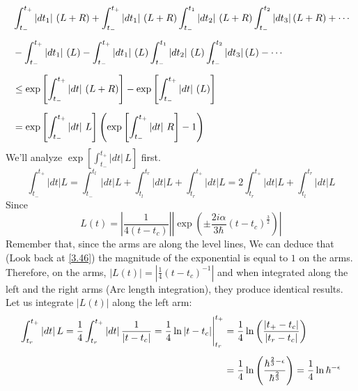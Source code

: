 \documentclass[12pt,a4paper]{article}
\begin{document}
	\begin{align}
		&\int_{t_{-}}^{t_{+}} \left| dt_{1} \right|\, \left( L + R \right) + \int_{t_{-}}^{t_{+}} \left| dt_{1} \right|\, \left( L + R \right) \int_{t_{-}}^{t_{1}} \left| dt_{2} \right|\, \left( L + R \right) \int_{t_{-}}^{t_{2}} \left| dt_{3} \right| \left( L + R \right) + \cdots \notag \\[5pt]
		&- \int_{t_{-}}^{t_{+}} \left| dt_{1} \right|\, \left( L \right) - \int_{t_{-}}^{t_{+}} \left| dt_{1} \right|\, \left( L \right) \int_{t_{-}}^{t_{1}} \left| dt_{2} \right|\, \left( L \right) \int_{t_{-}}^{t_{2}} \left| dt_{3} \right| \left( L \right) - \cdots \notag \\[5pt]
		&\leq \exp\left[ \int_{t_{-}}^{t_{+}} \left| dt \right|\, \left( L + R \right) \right] - \exp\left[ \int_{t_{-}}^{t_{+}} \left| dt \right|\, \left( L \right) \right] \notag \\[5pt]
		&= \exp\left[ \int_{t_{-}}^{t_{+}} \left| dt \right|\, L \right] \left( \exp\left[ \int_{t_{-}}^{t_{+}} \left| dt \right|\, R \right] - 1 \right) \label{4.64}
	\end{align}
	We'll analyze $\exp\left[ \int_{t_{-}}^{t_{+}} \left| dt \right|\, L \right]$ first. 
	\begin{equation}
		\int_{t_{-}}^{t_{+}} \left| dt \right| L = \int_{t_{-}}^{t_{l}} \left| dt \right| L + \int_{t_{l}}^{t_{r}} \left| dt \right| L + \int_{t_{r}}^{t_{+}} \left| dt \right| L = 2 \int_{t_{r}}^{t_{+}} \left| dt \right| L + \int_{t_{l}}^{t_{r}} \left| dt \right| L \label{4.65}
	\end{equation}
	Since
	\begin{equation}
		L(t) = \left| \dfrac{1}{4 \left( t - t_{c} \right)} \right| \left| \exp \left( \pm \dfrac{2i\alpha}{3\hbar} \left( t - t_{c} \right)^{\frac{3}{2}} \right) \right| \label{4.66}
	\end{equation}
	Remember that, since the arms are along the level lines, We can deduce that (Look back at \eqref{3.46}) the magnitude of the exponential is equal to $1$ on the arms. Therefore, on the arms, $\left| L(t) \right| = \left| \frac{1}{4} \left( t - t_{c} \right)^{-1} \right|$ and when integrated along the left and the right arms (Arc length integration), they produce identical results. Let us integrate $\left| L(t) \right|$ along the left arm:
	\begin{align}
		\int_{t_{r}}^{t_{+}} |dt| \, L
		= \frac{1}{4} \int_{t_{r}}^{t_{+}} |dt| \, \frac{1}{|t - t_c|}
		= \frac{1}{4} \Bigg. \ln|t - t_c| \Bigg|_{t_{r}}^{t_{+}}
		&= \frac{1}{4} \ln\left( \frac{|t_{+} - t_c|}{|t_{r} - t_c|} \right) \notag \\[5pt]
		&= \frac{1}{4} \ln \left( \frac{\hbar^{\frac{2}{3} - \epsilon}}{\hbar^{\frac{2}{3}}} \right) = \frac{1}{4} \ln \hbar^{-\epsilon} \label{4.67}
	\end{align}
\end{document}
